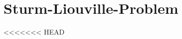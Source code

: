 %
%
%
\chapter{Sturm-Liouville-Problem\label{chapter:sturmliouville}}
\begin{refsection}

<<<<<<< HEAD




\printbibliography[heading=subbibliography]
\end{refsection}
